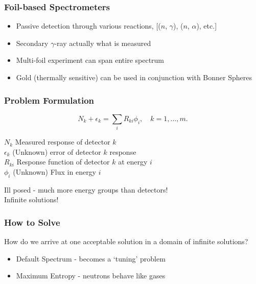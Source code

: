 \documentclass[fleqn]{beamer}
\begin{document}
\begin{frame}
\frametitle{Foil-based Spectrometers}

\begin{itemize}
\item Passive detection through various reactions, [($n$, $\gamma$), ($n$, $\alpha$), etc.]
\item Secondary $\gamma$-ray actually what is measured
\item Multi-foil experiment can span entire spectrum
\item Gold (thermally sensitive) can be used in conjunction with Bonner Spheres \cite{viererbl2012comparison}
\end{itemize}

\end{frame}

\begin{frame}
\frametitle{Problem Formulation}
\begin{equation}
\label{eqn:disc-response}
N_k + \epsilon_k = \sum_i R_{ki} \phi_i, \quad k = 1,\ldots, m .
\end{equation}

$N_k$ Measured response of detector $k$\\
$\epsilon_k$ (Unknown) error of detector $k$ response\\
$R_{ki}$ Response function of detector $k$ at energy $i$\\
$\phi_i$ (Unknown) Flux in energy $i$\\
\vspace{0.05\textheight}

Ill posed - much more energy groups than detectors!\\
Infinite solutions!

\end{frame}


\begin{frame}
\frametitle{How to Solve}

How do we arrive at one acceptable solution in a domain of infinite solutions?

\begin{itemize}
\item Default Spectrum - becomes a `tuning' problem
\item Maximum Entropy - neutrons behave like gases
\end{itemize}

\end{frame}
\end{document}
